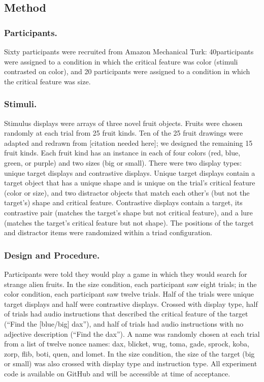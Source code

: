 \documentclass[10pt, letterpaper]{article}
\begin{document}
\hypertarget{method}{%
\subsection{Method}\label{method}}

\hypertarget{participants.}{%
\subsubsection{Participants.}\label{participants.}}

Sixty participants were recruited from Amazon Mechanical Turk:
40participants were assigned to a condition in which the critical
feature was color (stimuli contrasted on color), and 20 participants
were assigned to a condition in which the critical feature was size.

\hypertarget{stimuli.}{%
\subsubsection{Stimuli.}\label{stimuli.}}

Stimulus displays were arrays of three novel fruit objects. Fruits were
chosen randomly at each trial from 25 fruit kinds. Ten of the 25 fruit
drawings were adapted and redrawn from {[}citation needed here{]}; we
designed the remaining 15 fruit kinds. Each fruit kind has an instance
in each of four colors (red, blue, green, or purple) and two sizes (big
or small). There were two display types: unique target displays and
contrastive displays. Unique target displays contain a target object
that has a unique shape and is unique on the trial's critical feature
(color or size), and two distractor objects that match each other's (but
not the target's) shape and critical feature. Contrastive displays
contain a target, its contrastive pair (matches the target's shape but
not critical feature), and a lure (matches the target's critical feature
but not shape). The positions of the target and distractor items were
randomized within a triad configuration.

\hypertarget{design-and-procedure.}{%
\subsubsection{Design and Procedure.}\label{design-and-procedure.}}

Participants were told they would play a game in which they would search
for strange alien fruits. In the size condition, each participant saw
eight trials; in the color condition, each participant saw twelve
trials. Half of the trials were unique target displays and half were
contrastive displays. Crossed with display type, half of trials had
audio instructions that described the critical feature of the target
(``Find the {[}blue/big{]} dax''), and half of trials had audio
instructions with no adjective description (``Find the dax''). A name
was randomly chosen at each trial from a list of twelve nonce names:
dax, blicket, wug, toma, gade, sprock, koba, zorp, flib, boti, quen, and
lomet. In the size condition, the size of the target (big or small) was
also crossed with display type and instruction type. All experiment code
is available on GitHub and will be accessible at time of acceptance.
\end{document}
